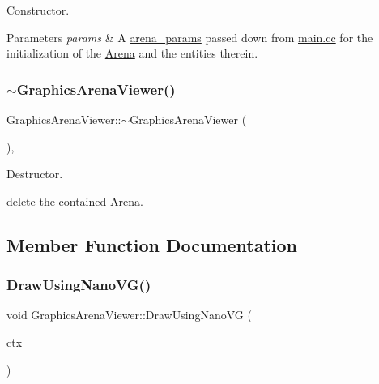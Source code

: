 Constructor. 


\begin{DoxyParams}{Parameters}
{\em params} & A \mbox{\hyperlink{structarena__params}{arena\+\_\+params}} passed down from \mbox{\hyperlink{main_8cc}{main.\+cc}} for the initialization of the \mbox{\hyperlink{class_arena}{Arena}} and the entities therein. \\
\hline
\end{DoxyParams}
\mbox{\label{class_graphics_arena_viewer_a88cea02aab1550a7f315fbf4f3868109}} 
\subsubsection{\texorpdfstring{$\sim$\+Graphics\+Arena\+Viewer()}{~GraphicsArenaViewer()}}
{\footnotesize\ttfamily Graphics\+Arena\+Viewer\+::$\sim$\+Graphics\+Arena\+Viewer (\begin{DoxyParamCaption}{ }\end{DoxyParamCaption})\hspace{0.3cm}{\ttfamily [inline]}, {\ttfamily [override]}}



Destructor. 

{\ttfamily delete} the contained \mbox{\hyperlink{class_arena}{Arena}}. 

\subsection{Member Function Documentation}
\mbox{\label{class_graphics_arena_viewer_a7d59755e3f7674f382127fe135492eeb}} 
\subsubsection{\texorpdfstring{Draw\+Using\+Nano\+V\+G()}{DrawUsingNanoVG()}}
{\footnotesize\ttfamily void Graphics\+Arena\+Viewer\+::\+Draw\+Using\+Nano\+VG (\begin{DoxyParamCaption}\item[{N\+V\+Gcontext $\ast$}]{ctx }\end{DoxyParamCaption})\hspace{0.3cm}{\ttfamily [override]}}



